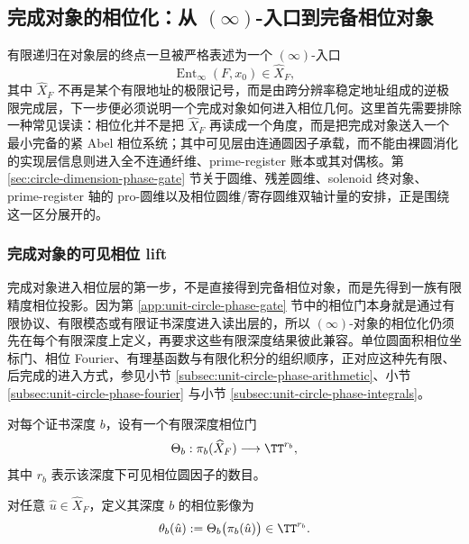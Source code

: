 \subsection{完成对象的相位化：从 \texorpdfstring{$(\infty)$}{(infty)}-入口到完备相位对象}\label{subsec:typed-address-biaxial-completion-phaseization-complete-phase-object}
有限递归在对象层的终点一旦被严格表述为一个 \((\infty)\)-入口
\[
\operatorname{Ent}_\infty(F,x_0)\in \widehat X_F,
\]
其中 \(\widehat X_F\) 不再是某个有限地址的极限记号，而是由跨分辨率稳定地址组成的逆极限完成层，下一步便必须说明一个完成对象如何进入相位几何。这里首先需要排除一种常见误读：相位化并不是把 \(\widehat X_F\) 再读成一个角度，而是把完成对象送入一个最小完备的紧 Abel 相位系统；其中可见层由连通圆因子承载，而不能由裸圆消化的实现层信息则进入全不连通纤维、prime-register 账本或其对偶核。第 \ref{sec:circle-dimension-phase-gate} 节关于圆维、残差圆维、solenoid 终对象、prime-register 轴的 pro-圆维以及相位圆维/寄存圆维双轴计量的安排，正是围绕这一区分展开的。

\subsubsection{完成对象的可见相位 lift}\label{subsubsec:typed-address-biaxial-completion-visible-phase-lift}
完成对象进入相位层的第一步，不是直接得到完备相位对象，而是先得到一族有限精度相位投影。因为第 \ref{app:unit-circle-phase-gate} 节中的相位门本身就是通过有限协议、有限模态或有限证书深度进入读出层的，所以 \((\infty)\)-对象的相位化仍须先在每个有限深度上定义，再要求这些有限深度结果彼此兼容。单位圆面积相位坐标门、相位 Fourier、有理基函数与有限化积分的组织顺序，正对应这种先有限、后完成的进入方式，参见小节 \ref{subsec:unit-circle-phase-arithmetic}、小节 \ref{subsec:unit-circle-phase-fourier} 与小节 \ref{subsec:unit-circle-phase-integrals}。

\begin{definition}[有限深度相位门]\label{def:typed-address-biaxial-completion-finite-depth-phase-gate}
对每个证书深度 \(b\)，设有一个有限深度相位门
\[
\Theta_b:\pi_b(\widehat X_F)\longrightarrow \TT^{r_b},
\]
其中 \(r_b\) 表示该深度下可见相位圆因子的数目。
\end{definition}

\begin{definition}[完成对象的有限深度相位影像]\label{def:typed-address-biaxial-completion-finite-depth-phase-image}
对任意 \(\hat u\in \widehat X_F\)，定义其深度 \(b\) 的相位影像为
\[
\theta_b(\hat u):=\Theta_b\bigl(\pi_b(\hat u)\bigr)\in \TT^{r_b}.
\]
\end{definition}

